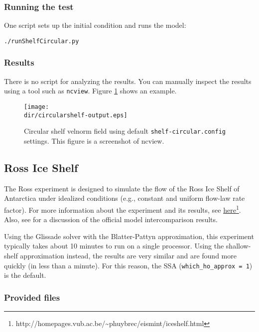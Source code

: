 \subsubsection{Running the test}
One script sets up the initial condition and runs the model:

\texttt{./runShelfCircular.py}

\subsubsection{Results}
There is no  script for analyzing the results.
You can manually inspect the results using a tool such as \texttt{ncview}.
Figure \ref{fig:circularshelf-results} shows an example.

\begin{figure}[H!]
	\centering
	\texttt{[image: \\dir/circularshelf-output.eps]}
	\caption{Circular shelf velnorm field using default \texttt{shelf-circular.config} settings. This figure is a screenshot of ncview.}
	\label{fig:circularshelf-results}
\end{figure}
\FloatBarrier

\subsection{Ross Ice Shelf}
\label{sc:ross_test}
The Ross experiment is designed to simulate the flow of the Ross Ice Shelf of Antarctica under idealized conditions (e.g., constant and uniform
flow-law rate factor). For more information about the experiment and its results, see 
\href{http://homepages.vub.ac.be/~phuybrec/eismint/iceshelf.html}{here}\footnote{http://homepages.vub.ac.be/\textasciitilde{}phuybrec/eismint/iceshelf.html}. 
Also, see \citet{MacAyeal:1996vn} for a discussion of the official model intercomparison results.

Using the Glissade solver with the Blatter-Pattyn approximation, this experiment typically 
takes about 10 minutes to run on a single processor.  Using the shallow-shelf approximation instead,
the results are very similar and are found more quickly (in less than a minute).
For this reason, the SSA (\texttt{which\_ho\_approx = 1}) is the default.

\subsubsection{Provided files}

